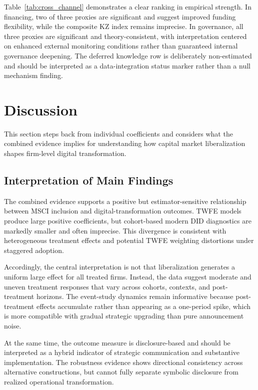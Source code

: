 Table~\ref{tab:cross_channel} demonstrates a clear ranking in empirical strength. In financing, two of three proxies are significant and suggest improved funding flexibility, while the composite KZ index remains imprecise. In governance, all three proxies are significant and theory-consistent, with interpretation centered on enhanced external monitoring conditions rather than guaranteed internal governance deepening. The deferred knowledge row is deliberately non-estimated and should be interpreted as a data-integration status marker rather than a null mechanism finding.

\section{Discussion}

This section steps back from individual coefficients and considers what the combined evidence implies for understanding how capital market liberalization shapes firm-level digital transformation.

\subsection{Interpretation of Main Findings}

The combined evidence supports a positive but estimator-sensitive relationship between MSCI inclusion and digital-transformation outcomes. TWFE models produce large positive coefficients, but cohort-based modern DID diagnostics are markedly smaller and often imprecise. This divergence is consistent with heterogeneous treatment effects and potential TWFE weighting distortions under staggered adoption.

Accordingly, the central interpretation is not that liberalization generates a uniform large effect for all treated firms. Instead, the data suggest moderate and uneven treatment responses that vary across cohorts, contexts, and post-treatment horizons. The event-study dynamics remain informative because post-treatment effects accumulate rather than appearing as a one-period spike, which is more compatible with gradual strategic upgrading than pure announcement noise.

At the same time, the outcome measure is disclosure-based and should be interpreted as a hybrid indicator of strategic communication and substantive implementation. The robustness evidence shows directional consistency across alternative constructions, but cannot fully separate symbolic disclosure from realized operational transformation.

